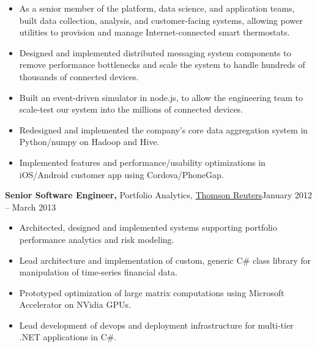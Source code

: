 \documentclass{article}
\begin{document}
\begin{itemize} \itemsep -2pt  %
    
    \item As a senior member of the platform, data science, and application teams, built data collection, analysis, and customer-facing systems, allowing power utilities to provision and manage Internet-connected smart thermostats.
    
    \item Designed and implemented distributed messaging system components to remove performance bottlenecks and scale the system to handle hundreds of thousands of connected devices.
    
    \item Built an event-driven simulator in node.js, to allow the engineering team to scale-test our system into the millions of connected devices.
    
    \item Redesigned and implemented the company's core data aggregation system in Python/numpy on Hadoop and Hive.
    
    \item Implemented features and performance/usability optimizations in iOS/Android customer app using Cordova/PhoneGap.
    
\end{itemize}

{\bf Senior Software Engineer,} Portfolio Analytics, \href{https://www.thomsonreuters.com}{Thomson Reuters}\hfill January 2012 -- March 2013
\begin{itemize} \itemsep -2pt

    \item Architected, designed and implemented systems supporting portfolio performance analytics and risk modeling.
    
    \item Lead architecture and implementation of custom, generic C\# class library for manipulation of time-series financial data.
    
    \item Prototyped optimization of large matrix computations using Microsoft Accelerator on NVidia GPUs.
    
    \item Lead development of devops and deployment infrastructure for multi-tier .NET applications in C#.
    
\end{itemize}
\end{document}
